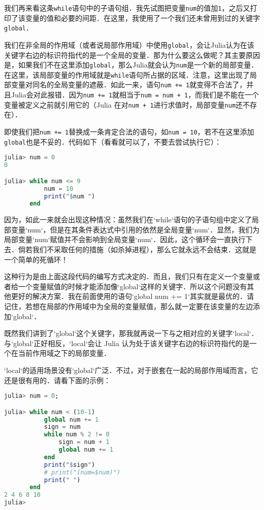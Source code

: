 我们再来看这条\verb|while|语句中的子语句组．我先试图把变量\verb|num|的值加\verb|1|，之后又打印了该变量的值和必要的间距．在这里，我使用了一个我们还未曾用到过的关键字\verb|global|．

我们在非全局的作用域（或者说局部作用域）中使用\verb|global|，会让Julia认为在该关键字右边的标识符指代的是一个全局的变量．那为什么要这么做呢？其主要原因是，如果我们不在这里添加\verb|global|，那么Julia就会认为\verb|num|是一个新的局部变量．在这里，该局部变量的作用域就是\verb|while|语句所占据的区域．注意，这里出现了局部变量对同名的全局变量的遮蔽．如此一来，语句\verb|num += 1|就变得不合法了，并且Julia会对此报错．因为\verb|num += 1|就相当于\verb|num = num + 1|，而我们是不能在一个变量被定义之前就引用它的（Julia 在对\verb|num + 1|进行求值时，局部变量\verb|num|还不存在）．

即使我们把\verb|num += 1|替换成一条肯定合法的语句，如\verb|num = 10|，若不在这里添加\verb|global|也是不妥的．代码如下（看看就可以了，不要去尝试执行它）：

\begin{lstlisting}[language=julia]
julia> num = 0
0

julia> while num <= 9 
           num = 10 
           print("$num ") 
       end
\end{lstlisting}

因为，如此一来就会出现这种情况：虽然我们在`while`语句的子语句组中定义了局部变量`num`，但是在其条件表达式中引用的依然是全局变量`num`．显然，我们为局部变量`num`赋值并不会影响到全局变量`num`．因此，这个循环会一直执行下去．倘若我们不采取任何的措施（如杀掉进程），那么它就永远不会结束．这就是一个简单的死循环！

这种行为是由上面这段代码的编写方式决定的．而且，我们只有在定义一个变量或者给一个变量赋值的时候才能添加像`global`这样的关键字．所以这个问题没有其他更好的解决方案．我在前面使用的语句`global num += 1`其实就是最优的．请记住，若想在局部的作用域中为全局的变量赋值，那么就一定要在该变量的左边添加`global`．

既然我们讲到了`global`这个关键字，那我就再说一下与之相对应的关键字`local`．与`global`正好相反，`local`会让 Julia 认为处于该关键字右边的标识符指代的是一个在当前作用域之下的局部变量．

`local`的适用场景没有`global`广泛．不过，对于嵌套在一起的局部作用域而言，它还是很有用的．请看下面的示例：

\begin{lstlisting}[language=julia]
julia> num = 0;

julia> while num < (10-1) 
           global num += 1
           sign = num
           while num % 2 != 0
               sign = num + 1
               global num += 1
           end
           print("$sign")
           # print("(num=$num)")
           print(" ")
       end
2 4 6 8 10 
julia> 
\end{lstlisting}

